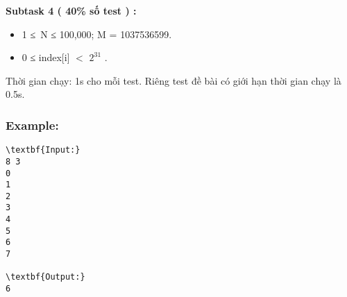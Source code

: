 \textbf{Subtask 4 ( 40\% số test ) : }
\begin{itemize}
	\item 

1 ≤ N ≤ 100,000; M = 1037536599.
	\item 

0 ≤ index[i] $<$ $2^{31}$ .
\end{itemize}

Thời gian chạy: 1s cho mỗi test. Riêng test đề bài có giới hạn thời gian chạy là 0.5s.

\subsubsection{Example:}
\begin{verbatim}
\textbf{Input:}
8 3
0
1
2
3
4
5
6
7

\textbf{Output:}
6
\end{verbatim}
